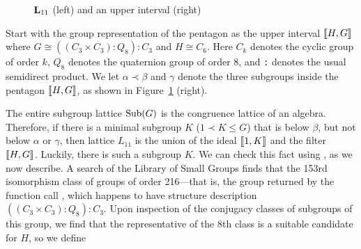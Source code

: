\begin{figure}[htb]
\begin{center}
  \hskip1cm
\end{center}
\caption{$\mathbf{L}_{11}$ (left) and an upper interval (right)}\label{fig:L11}
\end{figure}
Start with the group representation of the pentagon as the upper
interval $\llbracket H, G\rrbracket$ where $G \cong ((C_3 \times C_3) : Q_8) : C_3$ and 
$H \cong C_6$.
Here $C_k$ denotes the cyclic group of order $k$, $Q_8$ denotes the
quaternion group of order 8, and {\tt :} denotes the usual semidirect product.
We let $\alpha \prec \beta$ and $\gamma$ denote the three subgroups inside the
pentagon $\llbracket H, G \rrbracket$, as shown in Figure~\ref{fig:L11} (right).

The entire subgroup lattice $\operatorname{Sub}(G)$ is the congruence lattice of an
algebra. Therefore, if there is a minimal subgroup $K$ ($1 \prec K \leq G$) that
is below $\beta$, but not below  $\alpha$ or $\gamma$, then lattice $L_{11}$ is the 
union of the ideal $\llbracket 1, K\rrbracket$ and the filter $\llbracket H, G\rrbracket$.
Luckily, there is such a subgroup $K$. We can check this fact using \gap, as we now describe.
A search of the \gap Library of Small Groups finds that the 153rd
isomorphism class of groups of order 216---that is, the group 
returned by the function call , which happens to have
structure description $((C_3 \times C_3) : Q_8) : C_3$.
Upon inspection of the conjugacy classes of subgroups of this group, we 
find that the representative of the 8th class is a suitable candidate for 
$H$, so we define 

